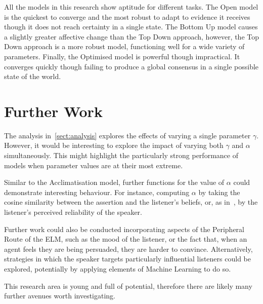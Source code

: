 All the models in this research show aptitude for different tasks. The Open model is the quickest to converge and the most robust to adapt to evidence it receives though it does not reach certainty in a single state. The Bottom Up model causes a slightly greater affective change than the Top Down approach, however, the Top Down approach is a more robust model, functioning well for a wide variety of parameters. Finally, the Optimised model is powerful though impractical. It converges quickly though failing to produce a global consensus in a single possible state of the world. 


\section{Further Work}

The analysis in~\cref{sect:analysis} explores the effects of varying a single parameter $\gamma$. However, it would be interesting to explore the impact of varying both $\gamma$ and $\alpha$ simultaneously. This might highlight the particularly strong performance of models when parameter values are at their most extreme.

Similar to the Acclimatisation model, further functions for the value of $\alpha$ could demonstrate interesting behaviour. For instance, computing $\alpha$ by taking the cosine similarity between the assertion and the listener's beliefs, or, as in~\cite{Hegselmann2002OpinionSimulation}, by the listener's perceived reliability of the speaker. 

Further work could also be conducted incorporating aspects of the Peripheral Route of the ELM, such as the mood of the listener, or the fact that, when an agent feels they are being persuaded, they are harder to convince. Alternatively, strategies in which the speaker targets particularly influential listeners could be explored, potentially by applying elements of Machine Learning to do so.

This research area is young and full of potential, therefore there are likely many further avenues worth investigating.
